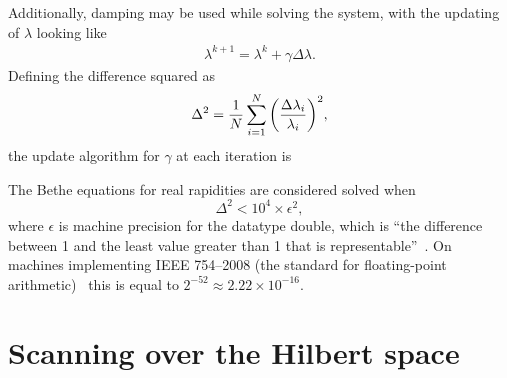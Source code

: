 \documentclass[11pt, a4paper]{report} %
\begin{document}
Additionally, damping may be used while solving the system, with the updating of \(\lambda\) looking like
\begin{align}
  \label{eq:dampednewton}
  \lambda^{k+1} = \lambda^k + \gamma \Delta \lambda.
\end{align}
Defining the difference squared as
\begin{align}
  \label{eq:51}
  \Delta^2 = \frac{1}{N}\sum_{i=1}^{N} {\qty(\frac{\Delta \lambda_i}{\lambda_i})}^2,
\end{align}
the update algorithm for \(\gamma\) at each iteration is
\begin{algorithm}
  \begin{algorithmic}[0]
    \Else{}
    \EndIf{}
  \end{algorithmic}
\end{algorithm}

The Bethe equations for real rapidities are considered solved when~\cite{Caux2009}
\begin{equation}
	\Delta^2 < 10^4 \times \epsilon^2,
\end{equation}
where \(\epsilon\) is machine precision for the datatype double, which is ``the difference between 1 and the least value greater than 1 that is representable''~\cite{cppstandard2016}.
On machines implementing IEEE 754--2008 (the standard for floating-point arithmetic)~\cite{ieeefp2008} this is equal to \({2^{-52} \approx 2.22 \times 10^{-16}}\).


\section{Scanning over the Hilbert space}
\end{document}
